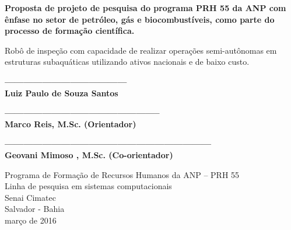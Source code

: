 \begin{center}
  \vspace*{0.8cm}
  {\Large \bf Proposta de projeto de pesquisa do programa PRH 55 da ANP com ênfase no setor de petróleo, gás e biocombustíveis, como parte do processo de formação científica.}

  \vspace*{2.5cm}

  {\Large Robô de inspeção com capacidade de realizar operações semi-autônomas em estruturas subaquáticas utilizando ativos nacionais e de baixo custo.}
           \vspace*{2.5cm}
  
  {\bf ---------------------------------------\\
  Luiz Paulo de Souza Santos}
  
  \vspace*{1.5cm}
  {\bf --------------------------------------------------\\
  Marco Reis, M.Sc. (Orientador)}
  
   \vspace*{1.5cm}
  {\bf ------------------------------------------------------------------\\
  Geovani Mimoso , M.Sc. (Co-orientador)}
  
   \begin{center}
   \end{center}
	\vspace*{- 0.3cm}

  {Programa de Formação de Recursos Humanos da ANP – PRH 55\\  
          [-0.3cm] Linha de pesquisa em sistemas computacionais\\
          [-3mm] Senai Cimatec\\
          [-3mm] Salvador - Bahia\\
          [-3mm] março de 2016}
\end{center}

\newpage
\thispagestyle{empty}
\begin{center}
 \vspace*{2cm}
\end{center}


